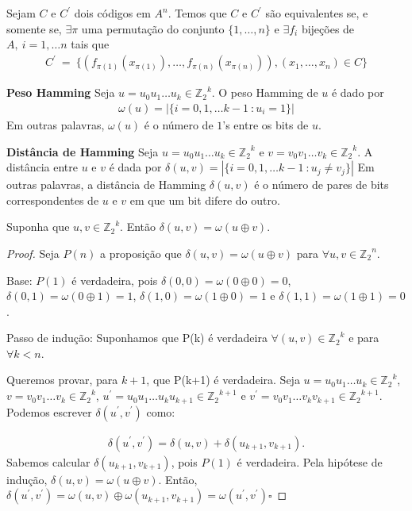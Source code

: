 \begin{corollary} Sejam $C$ e $C^{'}$ dois códigos em $A^n$. Temos que $C$ e $C^{'}$ são equivalentes se, e somente se, $\exists \pi$ uma permutação do conjunto $\{ 1, \ldots , n\}$ e $\exists f_i$ bijeções de $A,\ i=1, \ldots n$ tais que
   \begin{align*}
      C^{'}\ =\ \{ (f_{\pi(1)}(x_{\pi(1)}), \ldots,  f_{\pi(n)}(x_{\pi(n)})), (x_1, \ldots, x_n) \in C\}
   \end{align*}
\end{corollary}

\begin{definition} {\bf Peso Hamming} \label{PesoHamm} 
Seja $u=u_0u_1 \ldots u_k \in {\mathbb{Z}_2}^k$. O peso Hamming  de $u$ é dado por 
\begin{align*}
\omega(u)=|\{i=0,1, \ldots k-1\ : u_i=1\}|
\end{align*}
Em outras palavras, $\omega(u)$ é o número de $1$'s entre os bits de $u$.
\end{definition}

\begin{definition} {\bf Distância de Hamming} \label{DistHamm} 
Seja $u=u_0u_1 \ldots u_k \in {\mathbb{Z}_2}^k$ e $v=v_0v_1 \ldots v_k \in {\mathbb{Z}_2}^k$. A distância entre $u$ e $v$ é dada por $\delta(u,v)=|\{i=0,1, \ldots k-1\ : u_j \neq v_j\}|$
Em outras palavras, a distância de Hamming $\delta(u,v)$ é o número de pares de bits correspondentes de $u$ e $v$ em que um bit difere do outro.
\end{definition}

\begin{proposition} Suponha que $u, v \in {\mathbb{Z}_2}^k$. Então $\delta(u,v)=\omega(u \oplus v)$.
\end{proposition}

\begin{proof} Seja $P(n)$ a proposição que $\delta(u,v)=\omega(u \oplus v)$ para $\forall u,v \in {\mathbb{Z}_2}^n$.

Base: $P(1)$ é verdadeira, pois $\delta(0,0)=\omega(0 \oplus 0)=0$, $\delta(0,1)=\omega(0 \oplus 1)=1$, $\delta(1,0)=\omega(1 \oplus 0)=1$ e $\delta(1,1)=\omega(1 \oplus 1)=0$.

Passo de indução: Suponhamos que P(k) é verdadeira $\forall (u,v) \in {\mathbb{Z}_2}^k$ e para $\forall k < n$.

Queremos provar, para $k+1$, que P(k+1) é verdadeira. Seja $u=u_0u_1 \ldots u_k \in {\mathbb{Z}_2}^k$, $v=v_0v_1 \ldots v_k \in {\mathbb{Z}_2}^k$, $u^{'}=u_0u_1 \ldots u_ku_{k+1} \in {\mathbb{Z}_2}^{k+1}$ e $v^{'}=v_0v_1 \ldots v_kv_{k+1} \in {\mathbb{Z}_2}^{k+1}$. Podemos escrever $\delta(u^{'},v^{'})$ como:

\begin{align*}
\delta(u^{'},v^{'})=\delta(u,v)+\delta(u_{k+1},v_{k+1}).
\end{align*}
Sabemos calcular $\delta(u_{k+1},v_{k+1})$, pois $P(1)$ é verdadeira. Pela hipótese de indução, $\delta(u,v)=\omega(u \oplus v)$. Então, $\delta(u^{'},v^{'})=\omega(u,v) \oplus \omega(u_{k+1},v_{k+1})=\omega(u^{'},v^{'})$$\square$
\end{proof}

